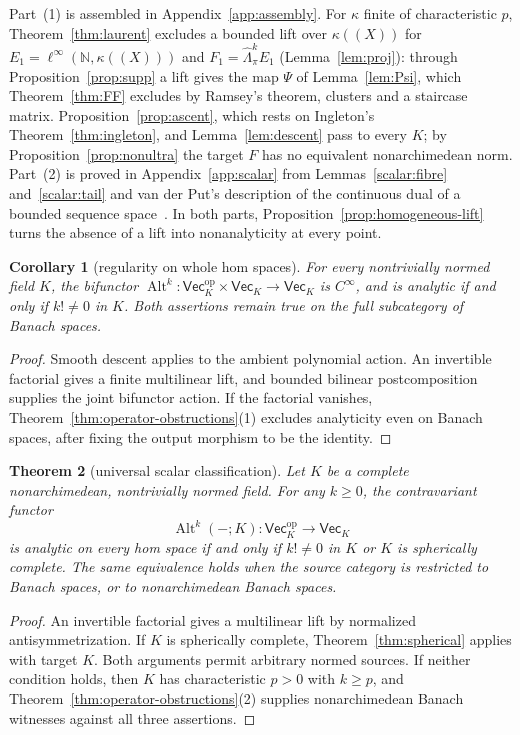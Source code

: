 \documentclass[11pt]{amsart}
\newtheorem{theorem}{Theorem}[section]
\newtheorem{corollary}[theorem]{Corollary}
\theoremstyle{definition}
\theoremstyle{remark}
\numberwithin{equation}{section}
\newcommand{\N}{\mathbb N}
\newcommand{\Alt}{\operatorname{Alt}}
\newcommand{\linf}{\ell^\infty}
\theoremstyle{plain}
\theoremstyle{definition}
\theoremstyle{plain}
\begin{document}
Part~(1) is assembled in Appendix~\ref{app:assembly}. For $\kappa$ finite of characteristic $p$, Theorem~\ref{thm:laurent}
excludes a bounded lift over $\kappa((X))$ for $E_1=\linf(\N,\kappa((X)))$ and $F_1=\widehat\Lambda^k_\pi E_1$
(Lemma~\ref{lem:proj}): through Proposition~\ref{prop:supp} a lift gives the map $\Psi$ of Lemma~\ref{lem:Psi}, which
Theorem~\ref{thm:FF} excludes by Ramsey's theorem, clusters and a staircase matrix. Proposition~\ref{prop:ascent}, which
rests on Ingleton's Theorem~\ref{thm:ingleton}, and Lemma~\ref{lem:descent} pass to every $K$; by
Proposition~\ref{prop:nonultra} the target $F$ has no equivalent nonarchimedean norm. Part~(2) is proved in
Appendix~\ref{app:scalar} from Lemmas~\ref{scalar:fibre} and~\ref{scalar:tail} and van der Put's description of the
continuous dual of a bounded sequence space~\cite{VdP}. In both parts, Proposition~\ref{prop:homogeneous-lift} turns the
absence of a lift into nonanalyticity at every point.

\begin{corollary}[regularity on whole hom spaces]\label{cor:classification}
For every nontrivially normed field $K$, the bifunctor
$\Alt^k\colon\mathsf{Vec}_K^{\mathrm{op}}\times\mathsf{Vec}_K\to\mathsf{Vec}_K$
is $C^\infty$, and is analytic if and only if $k!\ne0$ in $K$.
Both assertions remain true on the full subcategory of Banach spaces.
\end{corollary}
\begin{proof}
Smooth descent applies to the ambient polynomial action. An invertible factorial gives a finite
multilinear lift, and bounded bilinear postcomposition supplies the joint bifunctor action.
If the factorial vanishes, Theorem~\ref{thm:operator-obstructions}(1) excludes analyticity even on
Banach spaces, after fixing the output morphism to be the identity.
\end{proof}

\begin{theorem}[universal scalar classification]\label{thm:scalar-classification}
Let $K$ be a complete nonarchimedean, nontrivially normed field. For any $k\ge0$, the contravariant functor
\[
 \Alt^k(-;K)\colon\mathsf{Vec}_K^{\mathrm{op}}\longrightarrow\mathsf{Vec}_K
\]
is analytic on every hom space if and only if $k!\ne0$ in $K$ or $K$ is spherically complete. The same equivalence holds when the source category is restricted to Banach spaces, or to nonarchimedean Banach spaces.
\end{theorem}

\begin{proof}
An invertible factorial gives a multilinear lift by normalized antisymmetrization. If $K$ is spherically complete, Theorem~\ref{thm:spherical} applies with target $K$. Both arguments permit arbitrary normed sources. If neither condition holds, then $K$ has characteristic $p>0$ with $k\ge p$, and Theorem~\ref{thm:operator-obstructions}(2) supplies nonarchimedean Banach witnesses against all three assertions.
\end{proof}
\end{document}
